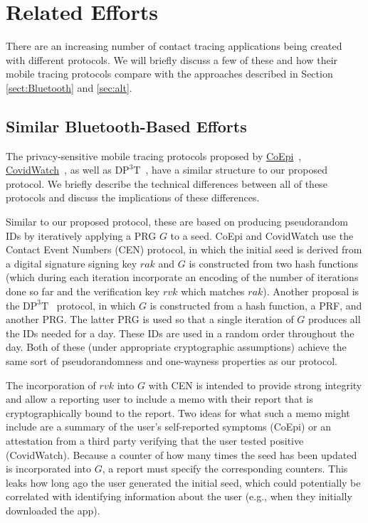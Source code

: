 \documentclass{article}
\begin{document}
\section{Related Efforts}
\label{sec:alternatives}
\label{sec:comparisons}

There are an increasing number of contact tracing applications being created with different protocols.
We will briefly discuss a few of these and how their mobile tracing protocols compare with the approaches described in Section \ref{sect:Bluetooth} and \ref{sec:alt}.

\subsection{Similar Bluetooth-Based Efforts}
The privacy-sensitive mobile tracing protocols proposed by
\href{https://www.coepi.org/}{CoEpi}~\cite{coepi},
\href{https://www.covid-watch.org/}{CovidWatch}~\cite{covidwatch},
as well as $\mathrm{DP^3T}$~\cite{dp3t}, 
have a similar structure to our proposed protocol.
We briefly describe the technical differences between all of these protocols and discuss the implications of these differences.

Similar to our proposed protocol, these are based on producing pseudorandom IDs by iteratively applying a PRG $G$ to a seed.
CoEpi and CovidWatch use the Contact Event Numbers (CEN) protocol, in which the initial seed is derived from a digital signature signing key $rak$ and $G$ is constructed from two hash functions (which during each iteration incorporate an encoding of the number of iterations done so far and the verification key $rvk$ which matches $rak$).
Another proposal is the $\mathrm{DP^3T}$~\cite{dp3t} protocol, in which $G$ is constructed from a hash function, a PRF, and another PRG.
The latter PRG is used so that a single iteration of $G$ produces all the IDs needed for a day.
These IDs are used in a random order throughout the day.
Both of these (under appropriate cryptographic assumptions) achieve the same sort of pseudorandomness and one-wayness properties as our protocol.

The incorporation of $rvk$ into $G$ with CEN is intended to provide strong integrity and allow a reporting user to include a memo with their report that is cryptographically bound to the report. Two ideas for what such a memo might include are a summary of the user's self-reported symptoms (CoEpi) or an attestation from a third party verifying that the user tested positive (CovidWatch). Because a counter of how many times the seed has been updated is incorporated into $G$, a report must specify the corresponding counters. This leaks how long ago the user generated the initial seed, which could potentially be correlated with identifying information about the user (e.g., when they initially downloaded the app). 
\end{document}
